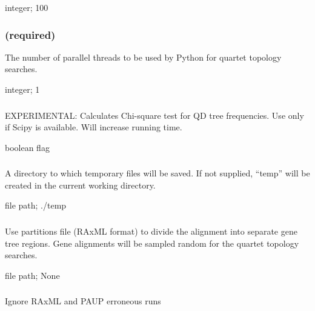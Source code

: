 \documentclass[letterpaper,12pt,english]{sphinxmanual}
\begin{document}
 integer;  100


\subsubsection{ (required)}
\label{\detokenize{prog_desc:t-number-of-threads-required}}
 The number of parallel threads to be used by Python for quartet topology searches.

 integer;  1


\subsubsection{}
\label{\detokenize{prog_desc:calc-qdstats}}
 EXPERIMENTAL: Calculates Chi-square test for QD tree frequencies. Use only  if Scipy is available. Will increase running time.

 boolean flag


\subsubsection{}
\label{\detokenize{prog_desc:e-temp-dir}}
 A directory to which temporary files will be saved. If not supplied, “temp” will be created in the current working directory.

 file path;  ./temp


\subsubsection{}
\label{\detokenize{prog_desc:g-genetrees}}
 Use partitions file (RAxML format) to divide the alignment into separate gene tree regions. Gene alignments will be sampled random for the quartet topology searches.

 file path;  None


\subsubsection{}
\label{\detokenize{prog_desc:ignore-errors}}
 Ignore RAxML and PAUP erroneous runs
\end{document}
